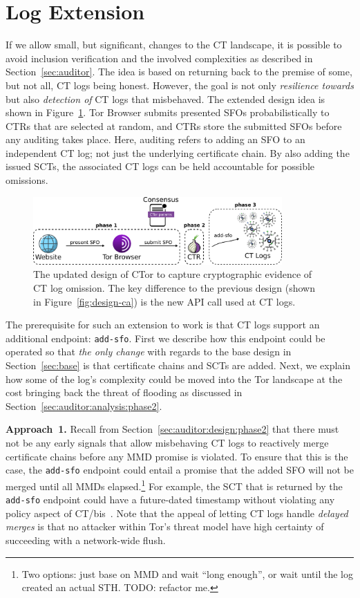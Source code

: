 \section{Log Extension} \label{sec:log}
If we allow small, but significant, changes to the CT landscape, it is possible
to avoid inclusion verification and the involved complexities as described in
Section~\ref{sec:auditor}.  The idea is based on returning back to the premise
of some, but not all, CT logs being honest.  However, the goal is not only
\emph{resilience towards} but also \emph{detection of} CT logs that misbehaved.
The extended design idea is shown in Figure~\ref{fig:ext-log}.  Tor
Browser submits presented SFOs probabilistically to CTRs that are selected
at random, and CTRs store the submitted SFOs before any auditing takes place.
Here, auditing refers to adding an SFO to an independent CT log; not just the
underlying certificate chain.  By also adding the issued SCTs, the associated CT
logs can be held accountable for possible omissions.

\begin{figure}
    \centering
    \includegraphics[width=0.85\textwidth]{img/design-log}
	\caption{The updated design of CTor to capture cryptographic evidence of CT
	log omission. The key difference to the previous design (shown in
	Figure~\ref{fig:design-ca}) is the new API call used at CT logs.}
    \label{fig:ext-log}
\end{figure}

The prerequisite for such an extension to work is that CT logs support an
additional endpoint:
	\texttt{add-sfo}.
First we describe how this endpoint could be operated so that \emph{the only
change} with regards to the base design in Section~\ref{sec:base} is that
certificate chains and SCTs are added.  Next, we explain how some of the log's
complexity could be moved into the Tor landscape at the cost bringing back the
threat of flooding as discussed in Section~\ref{sec:auditor:analysis:phase2}.

\textbf{Approach~1.}
Recall from Section~\ref{sec:auditor:design:phase2} that there must not be any
early signals that allow misbehaving CT logs to reactively merge certificate
chains before any MMD promise is violated.  To ensure that this is the case, the
\texttt{add-sfo} endpoint could entail a promise that the added SFO will not be
merged until all MMDs elapsed.\footnote{%
	Two options: just base on MMD and wait ``long enough'', or wait until the
	log created an actual STH.  TODO: refactor me.
} For example, the SCT that is returned by the \texttt{add-sfo} endpoint could
have a future-dated timestamp without violating any policy aspect of
CT/bis~\cite{ct/bis}.  Note that the appeal of letting CT logs handle
\emph{delayed merges} is that no attacker within Tor's threat model have high
certainty of succeeding with a network-wide flush.

